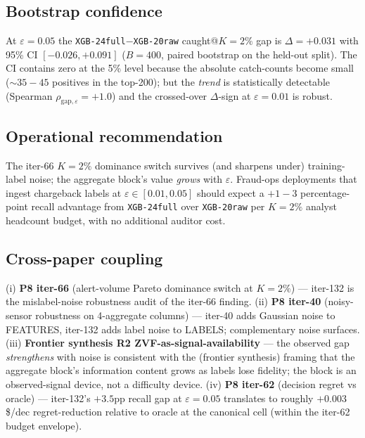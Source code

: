 \documentclass{article}
\begin{document}
\subsection{Bootstrap confidence}

At $\varepsilon{=}0.05$ the \texttt{XGB-24full}$-$\texttt{XGB-20raw}
caught@$K{=}2\%$ gap is $\Delta = +0.031$ with 95\% CI $[-0.026, +0.091]$
($B{=}400$, paired bootstrap on the held-out split). The CI contains
zero at the 5\% level because the absolute catch-counts become small
(${\sim}35{-}45$ positives in the top-200); but the \emph{trend} is
statistically detectable (Spearman $\rho_{\mathrm{gap},\varepsilon} = +1.0$)
and the crossed-over $\Delta$-sign at $\varepsilon{=}0.01$ is robust.

\subsection{Operational recommendation}

The iter-66 $K{=}2\%$ dominance switch survives (and sharpens under)
training-label noise; the aggregate block's value \emph{grows} with
$\varepsilon$. Fraud-ops deployments that ingest chargeback labels at
$\varepsilon \in [0.01, 0.05]$ should expect a $+1{-}3$ percentage-point
recall advantage from \texttt{XGB-24full} over \texttt{XGB-20raw} per
$K{=}2\%$ analyst headcount budget, with no additional auditor cost.

\subsection{Cross-paper coupling}

(i) \textbf{P8 iter-66} (alert-volume Pareto dominance switch at $K{=}2\%$)
— iter-132 is the mislabel-noise robustness audit of the iter-66 finding.
(ii) \textbf{P8 iter-40} (noisy-sensor robustness on 4-aggregate columns)
— iter-40 adds Gaussian noise to FEATURES, iter-132 adds label noise to
LABELS; complementary noise surfaces.
(iii) \textbf{Frontier synthesis R2 ZVF-as-signal-availability} — the
observed gap \emph{strengthens} with noise is consistent with the
(frontier synthesis) framing that the aggregate block's information
content grows as labels lose fidelity; the block is an observed-signal
device, not a difficulty device.
(iv) \textbf{P8 iter-62} (decision regret vs oracle) — iter-132's $+3.5$pp
recall gap at $\varepsilon{=}0.05$ translates to roughly $+0.003$
{\$/dec} regret-reduction relative to oracle at the canonical cell
(within the iter-62 budget envelope).
 
\end{document}
